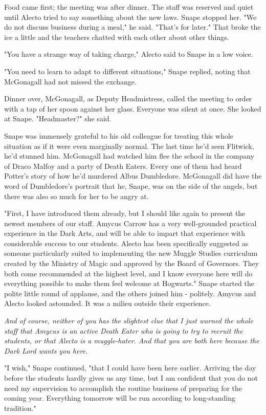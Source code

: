 Food came first; the meeting was after dinner. The staff was reserved and quiet until Alecto tried to say something about the new laws. Snape stopped her. "We do not discuss business during a meal," he said. "That's for later." That broke the ice a little and the teachers chatted with each other about other things.

"You have a strange way of taking charge," Alecto said to Snape in a low voice.

"You need to learn to adapt to different situations," Snape replied, noting that McGonagall had not missed the exchange.

Dinner over, McGonagall, as Deputy Headmistress, called the meeting to order with a tap of her spoon against her glass. Everyone was silent at once. She looked at Snape. "Headmaster?" she said.

Snape was immensely grateful to his old colleague for treating this whole situation as if it were even marginally normal. The last time he'd seen Flitwick, he'd stunned him. McGonagall had watched him flee the school in the company of Draco Malfoy and a party of Death Eaters. Every one of them had heard Potter's story of how he'd murdered Albus Dumbledore. McGonagall did have the word of Dumbledore's portrait that he, Snape, was on the side of the angels, but there was also so much for her to be angry at.

"First, I have introduced them already, but I should like again to present the newest members of our staff. Amycus Carrow has a very well-grounded practical experience in the Dark Arts, and will be able to impart that experience with considerable success to our students. Alecto has been specifically suggested as someone particularly suited to implementing the new Muggle Studies curriculum created by the Ministry of Magic and approved by the Board of Governors. They both come recommended at the highest level, and I know everyone here will do everything possible to make them feel welcome at Hogwarts." Snape started the polite little round of applause, and the others joined him - politely. Amycus and Alecto looked astounded. It was a milieu outside their experience.

\emph{And of course, neither of you has the slightest clue that I just warned the whole staff that Amycus is an active Death Eater who is going to try to recruit the students, or that Alecto is a muggle-hater. And that you are both here because the Dark Lord wants you here.}

"I wish," Snape continued, "that I could have been here earlier. Arriving the day before the students hardly gives us any time, but I am confident that you do not need my supervision to accomplish the routine business of preparing for the coming year. Everything tomorrow will be run according to long-standing tradition."

